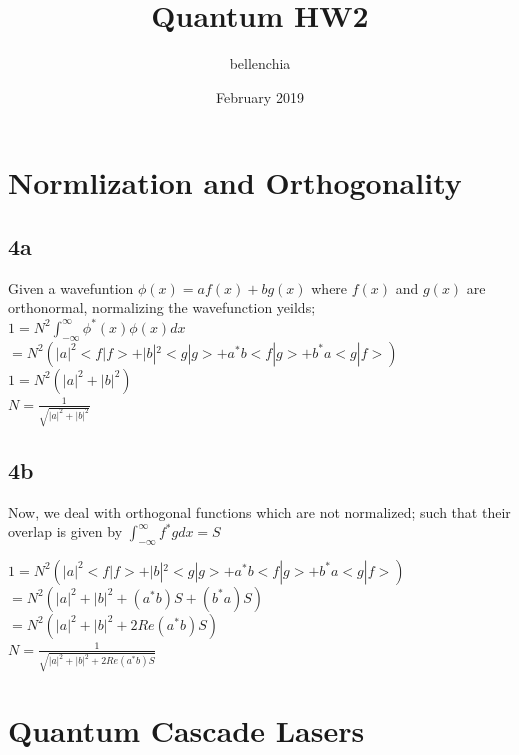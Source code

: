 \documentclass{article}
\title{Quantum HW2}
\author{bellenchia }
\date{February 2019}
\begin{document}
\maketitle
\section*{Normlization and Orthogonality}
\subsection*{4a}
Given a wavefuntion $\phi(x)=af(x)+bg(x)$ where $f(x)$ and $g(x)$ are orthonormal, normalizing the wavefunction yeilds;\\



$1=N^2{\displaystyle \int_{-\infty}^\infty}\phi^*(x)\phi(x)dx$\\

$=N^2(|a|^2<f|f>+|b|^2<g|g>+a^*b<f|g>+b^*a<g|f>)$\\

$1=N^2(|a|^2+|b|^2)$\\

$N=\frac{1}{\sqrt{|a|^2+|b|^2}}$\\

\subsection*{4b}

Now, we deal with orthogonal functions which are not normalized; such that their overlap is given by ${\displaystyle \int_{-\infty}^\infty}f^*gdx=S$

$1=N^2(|a|^2<f|f>+|b|^2<g|g>+a^*b<f|g>+b^*a<g|f>)$\\

$=N^2(|a|^2+|b|^2+(a^*b)S+(b^*a)S)$\\

$=N^2(|a|^2+|b|^2+2Re(a^*b)S)$\\

$N=\frac{1}{\sqrt{|a|^2+|b|^2+2Re(a^*b)S}}$\\

\section*{Quantum Cascade Lasers}
\end{document}
